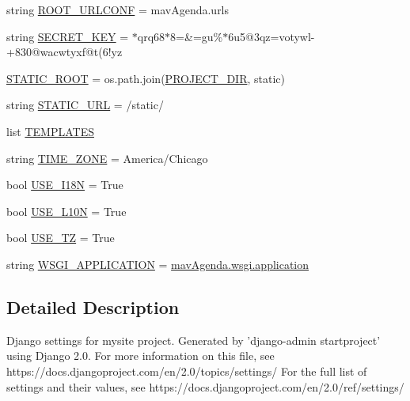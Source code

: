\begin{DoxyCompactItemize}
string \mbox{\hyperlink{namespacemavAgenda_1_1mavAgenda_1_1settings_aa9dd696dea6a3f711130e29e20d43189}{R\+O\+O\+T\+\_\+\+U\+R\+L\+C\+O\+NF}} = \textquotesingle{}mav\+Agenda.\+urls\textquotesingle{}
\item 
string \mbox{\hyperlink{namespacemavAgenda_1_1mavAgenda_1_1settings_abbb11ce5f3c93991b3c03f980c434d9c}{S\+E\+C\+R\+E\+T\+\_\+\+K\+EY}} = \textquotesingle{}$\ast$qrq68$\ast$8=\&=gu\%$\ast$6u5@3qz=votywl-\/+830@wacwtyxf@t(6!yz\textquotesingle{}
\item 
\mbox{\hyperlink{namespacemavAgenda_1_1mavAgenda_1_1settings_a0eaec5fd14613d117c7c2a800ee327bb}{S\+T\+A\+T\+I\+C\+\_\+\+R\+O\+OT}} = os.\+path.\+join(\mbox{\hyperlink{namespacemavAgenda_1_1mavAgenda_1_1settings_a430f2b0e8bf474dabb9115742e1a867c}{P\+R\+O\+J\+E\+C\+T\+\_\+\+D\+IR}}, \textquotesingle{}static\textquotesingle{})
\item 
string \mbox{\hyperlink{namespacemavAgenda_1_1mavAgenda_1_1settings_a7ea6c02e923fbbf572b530af31ef1bda}{S\+T\+A\+T\+I\+C\+\_\+\+U\+RL}} = \textquotesingle{}/static/\textquotesingle{}
\item 
list \mbox{\hyperlink{namespacemavAgenda_1_1mavAgenda_1_1settings_a4c3ff903ca3c3d39a0f2721eaf4a9638}{T\+E\+M\+P\+L\+A\+T\+ES}}
\item 
string \mbox{\hyperlink{namespacemavAgenda_1_1mavAgenda_1_1settings_a2f9c69f77469f2e2cc5a6a4cb89efa55}{T\+I\+M\+E\+\_\+\+Z\+O\+NE}} = \textquotesingle{}America/Chicago\textquotesingle{}
\item 
bool \mbox{\hyperlink{namespacemavAgenda_1_1mavAgenda_1_1settings_a9d9e3f36136019728fb859e3dcd2f7bf}{U\+S\+E\+\_\+\+I18N}} = True
\item 
bool \mbox{\hyperlink{namespacemavAgenda_1_1mavAgenda_1_1settings_a665cba5189ee13923df1b4efedb9824c}{U\+S\+E\+\_\+\+L10N}} = True
\item 
bool \mbox{\hyperlink{namespacemavAgenda_1_1mavAgenda_1_1settings_a9f4d0422f4a89cc0c4ef202db4f8754b}{U\+S\+E\+\_\+\+TZ}} = True
\item 
string \mbox{\hyperlink{namespacemavAgenda_1_1mavAgenda_1_1settings_a24a5ac1785232156f5b8a18983653ea8}{W\+S\+G\+I\+\_\+\+A\+P\+P\+L\+I\+C\+A\+T\+I\+ON}} = \textquotesingle{}\mbox{\hyperlink{namespacemavAgenda_1_1mavAgenda_1_1wsgi_a8df9e9048cc8d3c0368585caa40d8cc4}{mav\+Agenda.\+wsgi.\+application}}\textquotesingle{}
\end{DoxyCompactItemize}


\subsection{Detailed Description}
\begin{DoxyVerb}Django settings for mysite project.
Generated by 'django-admin startproject' using Django 2.0.
For more information on this file, see
https://docs.djangoproject.com/en/2.0/topics/settings/
For the full list of settings and their values, see
https://docs.djangoproject.com/en/2.0/ref/settings/
\end{DoxyVerb}
 

